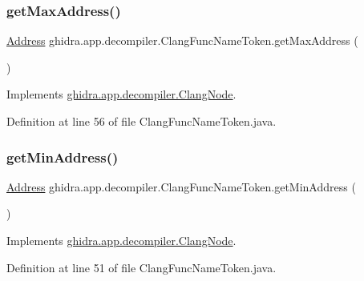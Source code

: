\subsubsection{\texorpdfstring{getMaxAddress()}{getMaxAddress()}}
{\footnotesize\ttfamily \mbox{\hyperlink{class_address}{Address}} ghidra.\+app.\+decompiler.\+Clang\+Func\+Name\+Token.\+get\+Max\+Address (\begin{DoxyParamCaption}{ }\end{DoxyParamCaption})\hspace{0.3cm}{\ttfamily [inline]}}



Implements \mbox{\hyperlink{interfaceghidra_1_1app_1_1decompiler_1_1_clang_node_a91e8beccce17b875e07d7c0747b43a97}{ghidra.\+app.\+decompiler.\+Clang\+Node}}.



Definition at line 56 of file Clang\+Func\+Name\+Token.\+java.

\mbox{\label{classghidra_1_1app_1_1decompiler_1_1_clang_func_name_token_a61430467edbd9abc0f53efa04608afbf}} 
\subsubsection{\texorpdfstring{getMinAddress()}{getMinAddress()}}
{\footnotesize\ttfamily \mbox{\hyperlink{class_address}{Address}} ghidra.\+app.\+decompiler.\+Clang\+Func\+Name\+Token.\+get\+Min\+Address (\begin{DoxyParamCaption}{ }\end{DoxyParamCaption})\hspace{0.3cm}{\ttfamily [inline]}}



Implements \mbox{\hyperlink{interfaceghidra_1_1app_1_1decompiler_1_1_clang_node_a28f86ac40636cd77392e26367db69dc3}{ghidra.\+app.\+decompiler.\+Clang\+Node}}.



Definition at line 51 of file Clang\+Func\+Name\+Token.\+java.

\mbox{\label{classghidra_1_1app_1_1decompiler_1_1_clang_func_name_token_a1ad70f0e4af3cac359c3a77fbfda3c58}} 
